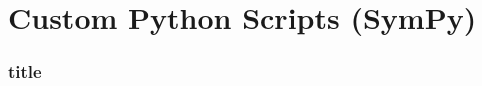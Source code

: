 \section{Custom Python Scripts (SymPy)}
    \begin{frame}
        \frametitle{title}
    \end{frame}

